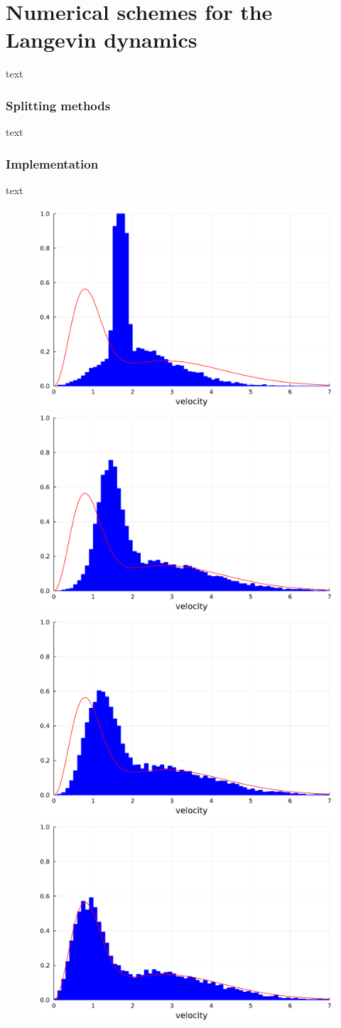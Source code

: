 \section{Numerical schemes for the Langevin dynamics}
text
    \subsubsection{Splitting methods}
    text
    \subsubsection{Implementation}
    text
    \begin{figure}[htbp]
        \begin{center}
            \includegraphics[width=0.49\linewidth]{figures/chapter1/velocities_20.pdf}
            \includegraphics[width=0.49\linewidth]{figures/chapter1/velocities_200.pdf}
            \includegraphics[width=0.49\linewidth]{figures/chapter1/velocities_400.pdf}
            \includegraphics[width=0.49\linewidth]{figures/chapter1/velocities_1000.pdf}

\end{center}
\end{figure}
